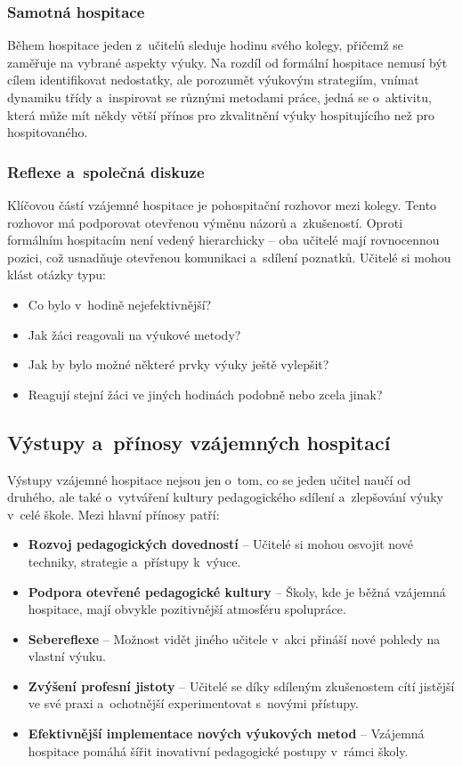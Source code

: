 \subsubsection{Samotná hospitace}
Během hospitace jeden z~učitelů sleduje hodinu svého kolegy, přičemž se zaměřuje na vybrané aspekty výuky. Na rozdíl od formální hospitace nemusí být cílem identifikovat nedostatky, ale porozumět výukovým strategiím, vnímat dynamiku třídy a~inspirovat se různými metodami práce, jedná se o~aktivitu, která může mít někdy větší přínos pro zkvalitnění výuky hospitujícího než pro hospitovaného.

\subsubsection{Reflexe a~společná diskuze}
Klíčovou částí vzájemné hospitace je pohospitační rozhovor mezi kolegy. Tento rozhovor má podporovat otevřenou výměnu názorů a~zkušeností. Oproti formálním hospitacím není vedený hierarchicky – oba učitelé mají rovnocennou pozici, což usnadňuje otevřenou komunikaci a~sdílení poznatků. Učitelé si mohou klást otázky typu:
\begin{itemize}
    \item Co bylo v~hodině nejefektivnější?
    \item Jak žáci reagovali na výukové metody?
    \item Jak by bylo možné některé prvky výuky ještě vylepšit?
    \item Reagují stejní žáci ve jiných hodinách podobně nebo zcela jinak?
\end{itemize}

\subsection{Výstupy a~přínosy vzájemných hospitací}
Výstupy vzájemné hospitace nejsou jen o~tom, co se jeden učitel naučí od druhého, ale také o~vytváření kultury pedagogického sdílení a~zlepšování výuky v~celé škole. Mezi hlavní přínosy patří:

\begin{itemize}
    \item \textbf{Rozvoj pedagogických dovedností} – Učitelé si mohou osvojit nové techniky, strategie a~přístupy k~výuce.
    \item \textbf{Podpora otevřené pedagogické kultury} – Školy, kde je běžná vzájemná hospitace, mají obvykle pozitivnější atmosféru spolupráce.
    \item \textbf{Sebereflexe} – Možnost vidět jiného učitele v~akci přináší nové pohledy na vlastní výuku.
    \item \textbf{Zvýšení profesní jistoty} – Učitelé se díky sdíleným zkušenostem cítí jistější ve své praxi a~ochotnější experimentovat s~novými přístupy.
    \item \textbf{Efektivnější implementace nových výukových metod} – Vzájemná hospitace pomáhá šířit inovativní pedagogické postupy v~rámci školy.
\end{itemize}

